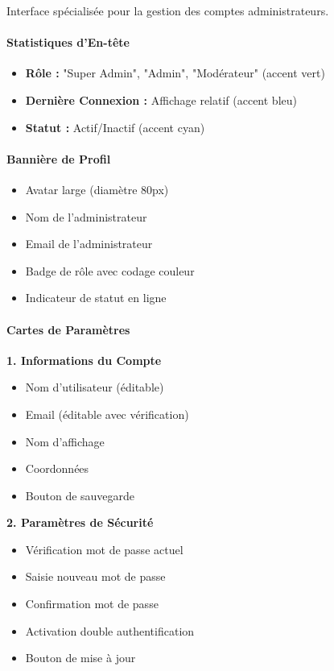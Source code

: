 \documentclass[12pt, a4paper]{report}
\begin{document}
Interface spécialisée pour la gestion des comptes administrateurs.

\paragraph{Statistiques d'En-tête}
\begin{itemize}
    \item \textbf{Rôle :} "Super Admin", "Admin", "Modérateur" (accent vert)
    \item \textbf{Dernière Connexion :} Affichage relatif (accent bleu)
    \item \textbf{Statut :} Actif/Inactif (accent cyan)
\end{itemize}

\paragraph{Bannière de Profil}
\begin{itemize}
    \item Avatar large (diamètre 80px)
    \item Nom de l'administrateur
    \item Email de l'administrateur
    \item Badge de rôle avec codage couleur
    \item Indicateur de statut en ligne
\end{itemize}

\paragraph{Cartes de Paramètres}

\textbf{1. Informations du Compte}
\begin{itemize}
    \item Nom d'utilisateur (éditable)
    \item Email (éditable avec vérification)
    \item Nom d'affichage
    \item Coordonnées
    \item Bouton de sauvegarde
\end{itemize}

\textbf{2. Paramètres de Sécurité}
\begin{itemize}
    \item Vérification mot de passe actuel
    \item Saisie nouveau mot de passe
    \item Confirmation mot de passe
    \item Activation double authentification
    \item Bouton de mise à jour
\end{itemize}
\end{document}
